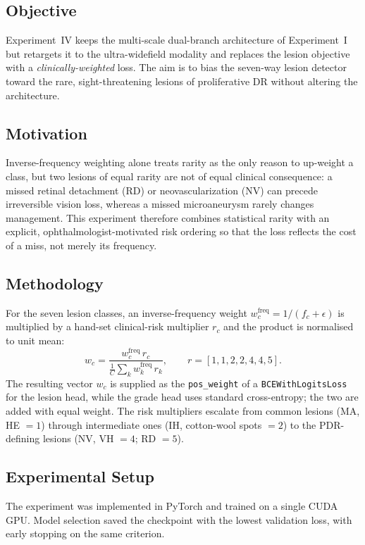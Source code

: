 \documentclass[journal,twoside,web]{ieeecolor}
\begin{document}
\subsection{Objective}
Experiment~IV keeps the multi-scale dual-branch architecture of Experiment~I but
retargets it to the ultra-widefield modality and replaces the lesion objective with
a \emph{clinically-weighted} loss. The aim is to bias the seven-way lesion detector
toward the rare, sight-threatening lesions of proliferative DR without altering the
architecture.

\subsection{Motivation}
Inverse-frequency weighting alone treats rarity as the only reason to up-weight a
class, but two lesions of equal rarity are not of equal clinical consequence: a
missed retinal detachment (RD) or neovascularization (NV) can precede irreversible
vision loss, whereas a missed microaneurysm rarely changes management. This
experiment therefore combines statistical rarity with an explicit,
ophthalmologist-motivated risk ordering so that the loss reflects the cost of a
miss, not merely its frequency.

\subsection{Methodology}
For the seven lesion classes, an inverse-frequency weight
$w^{\mathrm{freq}}_c = 1/(f_c+\epsilon)$ is multiplied by a hand-set clinical-risk
multiplier $r_c$ and the product is normalised to unit mean:
\begin{equation}
w_c = \frac{w^{\mathrm{freq}}_c \, r_c}{\frac{1}{C}\sum_{k} w^{\mathrm{freq}}_k \, r_k},
\qquad r = [1,1,2,2,4,4,5].
\label{eq:hybrid}
\end{equation}
The resulting vector $w_c$ is supplied as the \texttt{pos\_weight} of a
\texttt{BCEWithLogitsLoss} for the lesion head, while the grade head uses standard
cross-entropy; the two are added with equal weight. The risk multipliers escalate
from common lesions (MA, HE $=1$) through intermediate ones (IH, cotton-wool spots
$=2$) to the PDR-defining lesions (NV, VH $=4$; RD $=5$).

\subsection{Experimental Setup}
The experiment was implemented in PyTorch and trained on a single CUDA GPU.
Model selection saved the checkpoint with the lowest validation loss, with early
stopping on the same criterion.
\end{document}
